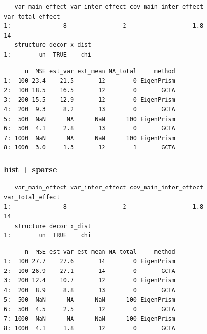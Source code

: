 \documentclass[]{article}
\begin{document}
\begin{verbatim}
   var_main_effect var_inter_effect cov_main_inter_effect var_total_effect
1:               8                2                   1.8               14
   structure decor x_dist
1:        un  TRUE    chi
\end{verbatim}

\begin{verbatim}
      n  MSE est_var est_mean NA_total     method
1:  100 23.4    21.5       12        0 EigenPrism
2:  100 18.5    16.5       12        0       GCTA
3:  200 15.5    12.9       12        0 EigenPrism
4:  200  9.3     8.2       13        0       GCTA
5:  500  NaN      NA      NaN      100 EigenPrism
6:  500  4.1     2.8       13        0       GCTA
7: 1000  NaN      NA      NaN      100 EigenPrism
8: 1000  3.0     1.3       12        1       GCTA
\end{verbatim}

\subsubsection{hist + sparse}\label{hist-sparse}

\begin{verbatim}
   var_main_effect var_inter_effect cov_main_inter_effect var_total_effect
1:               8                2                   1.8               14
   structure decor x_dist
1:        un  TRUE    chi
\end{verbatim}

\begin{verbatim}
      n  MSE est_var est_mean NA_total     method
1:  100 27.7    27.6       14        0 EigenPrism
2:  100 26.9    27.1       14        0       GCTA
3:  200 12.4    10.7       12        0 EigenPrism
4:  200  8.9     8.8       13        0       GCTA
5:  500  NaN      NA      NaN      100 EigenPrism
6:  500  4.5     2.5       12        0       GCTA
7: 1000  NaN      NA      NaN      100 EigenPrism
8: 1000  4.1     1.8       12        0       GCTA
\end{verbatim}
\end{document}
